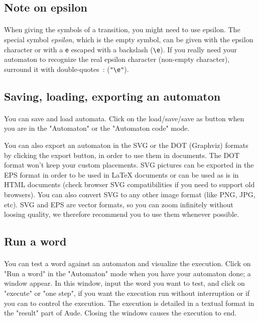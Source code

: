 \subsection{Note on epsilon}
\paragraph{}
When giving the symbols of a transition, you might need to use epsilon. The special symbol \textit{epsilon}, which is the empty symbol, can be given with the epsilon character or with a \verb!e! escaped with a backslash (\verb!\e!). If you really need your automaton to recognize the real epsilon character (non-empty character), surround it with double-quotes~: (\verb!"\e"!).

\subsection{Saving, loading, exporting an automaton}
\paragraph{}
You can save and load automata. Click on the load/save/save as button when you are in the "Automaton" or the "Automaton code" mode.

You can also export an automaton in the SVG or the DOT (Graphviz) formats by clicking the export button, in order to use them in documents. The DOT format won't keep your custom placements. SVG pictures can be exported in the EPS format in order to be used in LaTeX documents or can be used as is in HTML documents (check browser SVG compatibilities if you need to support old browsers). You can also convert SVG to any other image format (like PNG, JPG, etc). SVG and EPS are vector formats, so you can zoom infinitely without loosing quality, we therefore recommend you to use them whenever possible.

\subsection{Run a word}
\paragraph{}
You can test a word against an automaton and visualize the execution. Click on "Run a word" in the "Automaton" mode when you have your automaton done; a window appear. In this window, input the word you want to test, and click on "execute" or "one step", if you want the execution run without interruption or if you can to control the execution. The execution is detailed in a textual format in the "result" part of Aude. Closing the windows causes the execution to end.

